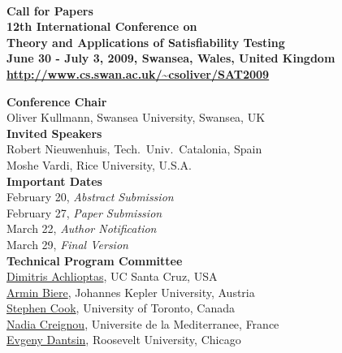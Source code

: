\documentclass[10pt]{article}
\newcommand{\bthlight}[1]{{\color[rgb]{0.2,0.2,0.5}#1}}
\newcommand{\bhlight}[1]{{\color[rgb]{0.2,0.2,0.6}#1}}
\begin{document}
\pagestyle{empty}

\begin{center}
  {\bf
    \bthlight{{\huge SAT 2009}} \\[0.3cm]
    {\Large Call for Papers} \\[0.15cm]
    \bthlight{
      {\LARGE 12th International Conference on} \\[0.2cm]
      {\LARGE Theory and Applications of Satisfiability Testing} \\[0.15cm]
      {\Large June 30 - July 3, 2009, Swansea, Wales, United Kingdom}
    } \\[0.15cm]
    {\large \url{http://www.cs.swan.ac.uk/~csoliver/SAT2009}}
  }
\end{center}

\vspace*{-0.1cm}
%
\begin{minipage}[t]{7.5cm}
{\large {\bf \bhlight{Conference Chair}}} \\[0.05cm]
{\small
  Oliver Kullmann, Swansea University, Swansea, UK\\[0.3cm]
}
{\large {\bf \bhlight{Invited Speakers}}} \\%
{\small
  Robert Nieuwenhuis, Tech.~Univ.~Catalonia, Spain\\
  Moshe Vardi, Rice University, U.S.A.\\[0.3cm]
}
{\large {\bf \bhlight{Important Dates}}} \\[0.05cm]
{\small
  February 20, {\em Abstract Submission} \\
  February 27, {\em Paper Submission} \\
  March 22, {\em Author Notification} \\
  March 29, {\em Final Version} \\[0.3cm]
}
{\large {\bf \bhlight{Technical Program Committee}}} \\[0.01cm]
{\footnotesize
          \href{http://www.cs.ucsc.edu/~optas/}{Dimitris Achlioptas}, UC Santa Cruz, USA \\
          \href{http://fmv.jku.at/biere/}{Armin Biere}, Johannes Kepler University, Austria  \\
          \href{http://www.cs.toronto.edu/~sacook/}{Stephen Cook}, University of Toronto, Canada \\
          \href{http://www.dil.univ-mrs.fr/membres.html}{Nadia Creignou}, Universite de la Mediterranee, France  \\
          \href{http://cs.roosevelt.edu/~dantsin/}{Evgeny Dantsin}, Roosevelt University, Chicago \\
}
\end{minipage}
\end{document}
